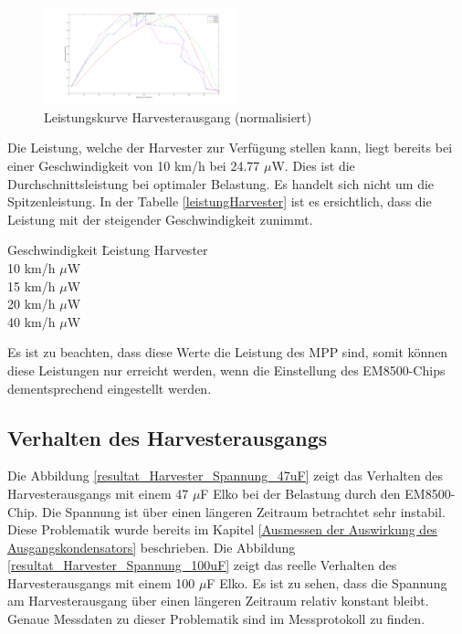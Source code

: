 \begin{figure}[ht]
    \includegraphics[width=0.5\textwidth]{4Resultate/imag/MPPHarvester.png} 
    \caption{Leistungskurve Harvesterausgang (normalisiert)}
    \label{mpp_resultat_harvester}
\end{figure}

Die Leistung, welche der Harvester zur Verfügung stellen kann, liegt bereits bei einer Geschwindigkeit von 10 km/h bei 24.77 $\mu$W. Dies ist die Durchschnittsleistung bei optimaler Belastung. Es handelt sich nicht um die Spitzenleistung. In der Tabelle \ref{leistungHarvester} ist es ersichtlich, dass die Leistung mit der steigender Geschwindigkeit zunimmt.

\begin{minipage}{\textwidth}
    \begin{tabbing}
    \label{leistungHarvester}
        Geschwindigkeit \quad\= Leistung Harvester \\[0.8ex]
        10 km/h    $\mu$W \\
        15 km/h    $\mu$W \\
        20 km/h  $\mu$W \\
        40 km/h  $\mu$W \\
    \end{tabbing}
\end{minipage}

Es ist zu beachten, dass diese Werte die Leistung des MPP sind, somit können diese Leistungen nur erreicht werden, wenn die Einstellung des EM8500-Chips dementsprechend eingestellt werden.


\subsection{Verhalten des Harvesterausgangs}

Die Abbildung \ref{resultat_Harvester_Spannung_47uF} zeigt das Verhalten des Harvesterausgangs mit einem 47 $\mu$F Elko bei der Belastung durch den EM8500-Chip. Die Spannung ist über einen längeren Zeitraum betrachtet sehr instabil. Diese Problematik wurde bereits im Kapitel \ref{Ausmessen der Auswirkung des Ausgangskondensators} beschrieben. Die Abbildung \ref{resultat_Harvester_Spannung_100uF} zeigt das reelle Verhalten des Harvesterausgangs mit einem 100 $\mu$F Elko. Es ist zu sehen, dass die Spannung am Harvesterausgang über einen längeren Zeitraum relativ konstant bleibt. Genaue Messdaten zu dieser Problematik sind im Messprotokoll  zu finden.

